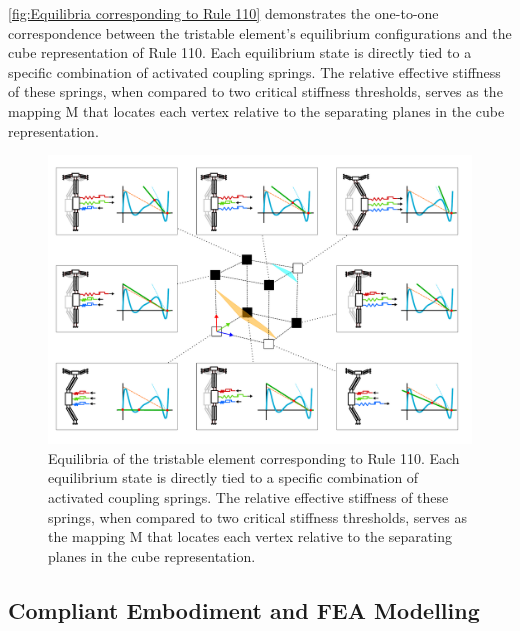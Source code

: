 \autoref*{fig:Equilibria corresponding to Rule 110} demonstrates the one-to-one correspondence between the tristable element's equilibrium configurations and the cube representation of Rule 110. Each equilibrium state is directly tied to a specific combination of activated coupling springs. The relative effective stiffness of these springs, when compared to two critical stiffness thresholds, serves as the mapping M that locates each vertex relative to the separating planes in the cube representation.
\begin{figure}[H]
    \centering
    \includegraphics[width=\textwidth]{images/SVGs/Equilibria3.pdf}
    \caption{Equilibria of the tristable element corresponding to Rule 110. Each equilibrium state is directly tied to a specific combination of activated coupling springs. The relative effective stiffness of these springs, when compared to two critical stiffness thresholds, serves as the mapping M that locates each vertex relative to the separating planes in the cube representation.}
    \label{fig:Equilibria corresponding to Rule 110}
\end{figure}

\subsection*{Compliant Embodiment and FEA Modelling}

